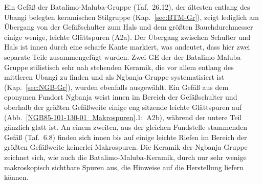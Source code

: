 \begin{multicols}{2}
Ein Gefäß der Batalimo-Maluba-Gruppe (Taf.~26.12), der ältesten entlang des \mbox{Ubangi} belegten keramischen Stilgruppe (Kap.~\ref{sec:BTM-Gr}), zeigt lediglich am Übergang von der Gefäßschulter zum Hals und dem größten Bauchdurchmesser einige wenige, leichte Glättspuren (A2a). Der Übergang zwischen Schulter und Hals ist innen durch eine scharfe Kante markiert, was andeutet, dass hier zwei separate Teile zusammengefügt wurden. Zwei GE der der Batalimo-Maluba-Gruppe stilistisch sehr nah stehenden Keramik, die vor allem entlang des mittleren \mbox{Ubangi} zu finden und als \mbox{Ngbanja}-Gruppe systematisiert ist (Kap.~\ref{sec:NGB-Gr}), wurden ebenfalls ausgewählt. Ein Gefäß aus dem eponymen Fundort \mbox{Ngbanja} weist innen im Bereich der Gefäßschulter und oberhalb der größten Gefäßweite einige eng sitzende leichte Glättspuren auf (Abb.~\ref{NGB85-101-130-01_Makrospuren}.1:~A2b), während der untere Teil gänzlich glatt ist. An einem zweiten, aus der gleichen Fundstelle stammenden Gefäß (Taf.~6.8) finden sich innen bis auf einige leichte Riefen im Bereich der größten Gefäßweite keinerlei Makrospuren. Die Keramik der \mbox{Ngbanja}-Gruppe zeichnet sich, wie auch die Batalimo-Maluba-Keramik, durch nur sehr wenige makroskopisch sichtbare Spuren aus, die Hinweise auf die Herstellung liefern können.


\end{multicols}
